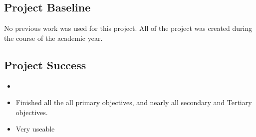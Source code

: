 \subsection{Project Baseline}
\label{sub:baseline}

No previous work was used for this project. All of the project was created during the course of the academic year.

\subsection{Project Success}
\begin{itemize}
	\item 
	\item Finished all the all primary objectives, and nearly all secondary and Tertiary objectives. 
	\item Very useable
\end{itemize}

